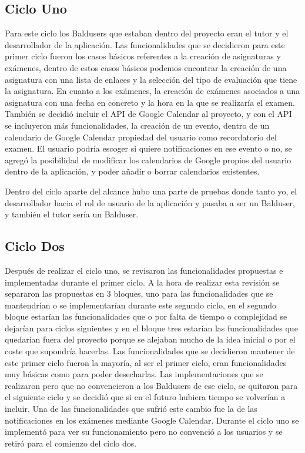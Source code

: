 \subsection{Ciclo Uno}
\label{subsecc:ciclo Uno}

Para este ciclo los Baldusers que estaban dentro del proyecto eran el tutor y el desarrollador de la aplicación. Las funcionalidades que se decidieron para este primer ciclo fueron los casos básicos referentes a la creación de asignaturas y exámenes, dentro de estos casos básicos podemos encontrar la creación de una asignatura con una lista de enlaces y la selección del tipo de evaluación que tiene la asignatura. En cuanto a los exámenes, la creación de exámenes asociados a una asignatura con una fecha en concreto y la hora en la que se realizaría el examen.
También se decidió incluir el API de Google Calendar al proyecto, y con el API se incluyeron más funcionalidades, la creación de un evento, dentro de un calendario de Google Calendar propiedad del usuario como recordatorio del examen. El usuario podría escoger si quiere notificaciones en ese evento o no, se agregó la  posibilidad de modificar los calendarios de Google propios del usuario dentro de la aplicación, y poder añadir o borrar calendarios existentes.
 
Dentro del ciclo aparte del alcance hubo una parte de pruebas donde tanto yo, el desarrollador hacia el rol de usuario de la aplicación y pasaba a ser un Balduser, y también el tutor sería un Balduser.


\subsection{Ciclo Dos}
\label{subsecc:ciclo Dos}

Después de realizar el ciclo uno, se revisaron las funcionalidades propuestas e implementadas durante el primer ciclo. A la hora de realizar esta revisión se separaron las propuestas en 3 bloques, uno para las funcionalidades que se mantendrían o se implementarían durante este segundo ciclo, en el segundo bloque estarían las funcionalidades que o por falta de tiempo o complejidad se dejarían para ciclos siguientes y en el bloque tres estarían las funcionalidades que quedarían fuera del proyecto porque se alejaban mucho de la idea inicial o por el coste que supondría hacerlas.
Las funcionalidades que se decidieron mantener de este primer ciclo fueron la mayoría, al ser el primer ciclo, eran funcionalidades muy básicas como para poder desecharlas. Las implementaciones que se realizaron pero que no convencieron a los Baldusers de ese ciclo, se quitaron para el siguiente ciclo y se decidió que si en el futuro hubiera tiempo se volverían a incluir. Una de las funcionalidades que sufrió este cambio fue la de las notificaciones en los exámenes mediante Google Calendar. Durante el ciclo uno se implementó para ver su funcionamiento pero no convenció a los usuarios y se retiró para el comienzo del ciclo dos.

